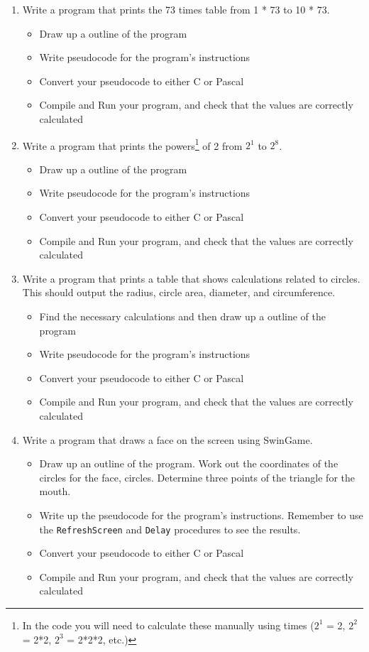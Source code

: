 \begin{enumerate}
  \item Write a program that prints the 73 times table from 1 * 73 to 10 * 73.
  \begin{itemize}
    \item Draw up a outline of the program
    \item Write pseudocode for the program's instructions
    \item Convert your pseudocode to either C or Pascal
    \item Compile and Run your program, and check that the values are correctly calculated
  \end{itemize}
  
  \item Write a program that prints the powers\footnote{In the code you will need to calculate these manually using times ($2^1$ = 2, $2^2$ = 2*2, $2^3$ = 2*2*2, etc.)} of 2 from $2^1$ to $2^8$.
  \begin{itemize}
    \item Draw up a outline of the program
    \item Write pseudocode for the program's instructions
    \item Convert your pseudocode to either C or Pascal
    \item Compile and Run your program, and check that the values are correctly calculated
  \end{itemize}
  
  
  \item Write a program that prints a table that shows calculations related to circles. This should output the  radius, circle area, diameter, and circumference.
  \begin{itemize}
    \item Find the necessary calculations and then draw up a outline of the program
    \item Write pseudocode for the program's instructions
    \item Convert your pseudocode to either C or Pascal
    \item Compile and Run your program, and check that the values are correctly calculated
  \end{itemize}
  
  \item Write a program that draws a face on the screen using SwinGame.
  \begin{itemize}
    \item Draw up an outline of the program. Work out the coordinates of the circles for the face, circles. Determine three points of the triangle for the mouth.
    \item Write up the pseudocode for the program's instructions. Remember to use the \texttt{RefreshScreen} and \texttt{Delay} procedures to see the results.
    \item Convert your pseudocode to either C or Pascal
    \item Compile and Run your program, and check that the values are correctly calculated
  \end{itemize}
\end{enumerate}

